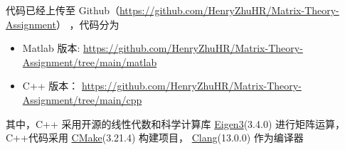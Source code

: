 

代码已经上传至
Github（\href{https://github.com/HenryZhuHR/Matrix-Theory-Assignment}{https://github.com/HenryZhuHR/Matrix-Theory-Assignment}）
，代码分为
\begin{itemize}
    \item Matlab 版本: \href{https://github.com/HenryZhuHR/Matrix-Theory-Assignment/tree/main/matlab}{https://github.com/HenryZhuHR/Matrix-Theory-Assignment/tree/main/matlab}
    \item C++ 版本： \href{https://github.com/HenryZhuHR/Matrix-Theory-Assignment/tree/main/cpp}{https://github.com/HenryZhuHR/Matrix-Theory-Assignment/tree/main/cpp}
\end{itemize}

\vspace{1cm}

其中，C++ 采用开源的线性代数和科学计算库 \href{https://eigen.tuxfamily.org/}{Eigen3}(3.4.0) 进行矩阵运算，C++代码采用 \href{http://arma.sourceforge.net/}{CMake}(3.21.4) 构建项目， \href{https://clang.llvm.org/}{Clang}(13.0.0) 作为编译器